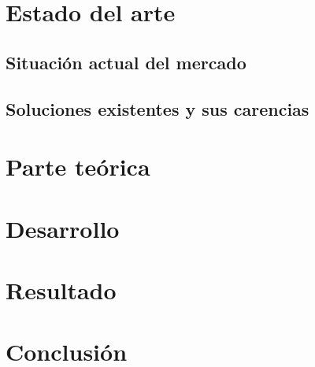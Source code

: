\documentclass[11pt]{article}
\begin{document}
\section{Estado del arte}

\subsection{Situación actual del mercado}
\subsection{Soluciones existentes y sus carencias}


\section{Parte teórica}

\section{Desarrollo}

\section{Resultado}

\section{Conclusión}


\pagebreak

\begin{thebibliography}{99}
 
\end{thebibliography}
\end{document}
